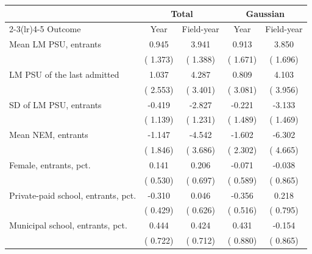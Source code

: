 \begin{tabular}{lcccc}
\toprule
 & \multicolumn{2}{c}{Total} & \multicolumn{2}{c}{Gaussian} \\
\cmidrule(lr){2-3}\cmidrule(lr){4-5}
Outcome & Year & Field-year & Year & Field-year \\
\midrule
Mean LM PSU, entrants &   0.945 &   3.941\sym{***} &   0.913 &   3.850\sym{**} \\
 & ( 1.373) & ( 1.388) & ( 1.671) & ( 1.696) \\
LM PSU of the last admitted &   1.037 &   4.287 &   0.809 &   4.103 \\
 & ( 2.553) & ( 3.401) & ( 3.081) & ( 3.956) \\
SD of LM PSU, entrants &  -0.419 &  -2.827\sym{**} &  -0.221 &  -3.133\sym{**} \\
 & ( 1.139) & ( 1.231) & ( 1.489) & ( 1.469) \\
Mean NEM, entrants &  -1.147 &  -4.542 &  -1.602 &  -6.302 \\
 & ( 1.846) & ( 3.686) & ( 2.302) & ( 4.665) \\
Female, entrants, pct. &   0.141 &   0.206 &  -0.071 &  -0.038 \\
 & ( 0.530) & ( 0.697) & ( 0.589) & ( 0.865) \\
Private-paid school, entrants, pct. &  -0.310 &   0.046 &  -0.356 &   0.218 \\
 & ( 0.429) & ( 0.626) & ( 0.516) & ( 0.795) \\
Municipal school, entrants, pct. &   0.444 &   0.424 &   0.431 &  -0.154 \\
 & ( 0.722) & ( 0.712) & ( 0.880) & ( 0.865) \\
\bottomrule
\end{tabular}
